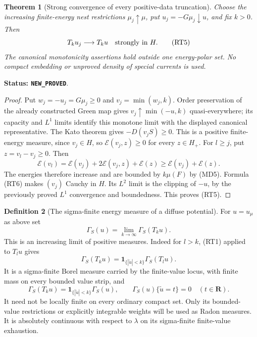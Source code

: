 \documentclass[11pt,a4paper]{article}
\numberwithin{equation}{section}
\newtheorem{theorem}{Theorem}[section]
\theoremstyle{definition}
\newtheorem{definition}[theorem]{Definition}
\theoremstyle{remark}
\begin{document}
\begin{theorem}[Strong convergence of every positive-data truncation]
\label{thm:r11-positive-diffuse-strong-truncations}
Choose the increasing finite-energy nest restrictions
$\mu_j\uparrow\mu$, put $u_j=-G\mu_j\downarrow u$, and
fix $k>0$.  Then
\[
                  T_k u_j\longrightarrow T_k u
                                  \quad\hbox{strongly in }H.
 \tag{RT5}
\]
The canonical monotonicity assertions hold outside one
energy-polar set.  No compact embedding or unproved density
of special currents is used.
\end{theorem}

\noindent\textbf{Status: \texttt{NEW\_PROVED}}.

\begin{proof}
Put $w_j=-u_j=G\mu_j\ge0$ and $v_j=\min(w_j,k)$.
Order preservation of the already constructed Green map gives
$v_j\uparrow\min(-u,k)$ quasi-everywhere; its capacity and
$L^1$ limits identify this monotone limit with the displayed
canonical representative.  The Kato theorem gives
$-D(v_jS)\ge0$.  This is a positive finite-energy measure,
since $v_j\in H$, so
$\mathcal E(v_j,z)\ge0$ for every $z\in H_+$.
For $l\ge j$, put $z=v_l-v_j\ge0$.  Then
\[
 \mathcal E(v_l)=\mathcal E(v_j)+2\mathcal E(v_j,z)
                                      +\mathcal E(z)
                  \ge\mathcal E(v_j)+\mathcal E(z).
 \tag{RT6}
\]
The energies therefore increase and are bounded by $k\mu(F)$
by (MD5).  Formula (RT6) makes $(v_j)$ Cauchy in $H$.
Its $L^2$ limit is the clipping of $-u$, by the previously
proved $L^1$ convergence and boundedness.  This proves (RT5).
\end{proof}

\begin{definition}[The sigma-finite energy measure of a diffuse potential]
\label{def:r11-positive-diffuse-energy-measure}
For $u=u_\mu$ as above set
\[
              \Gamma_S(u)=\lim_{k\to\infty}\Gamma_S(T_ku).
 \tag{RT7}
\]
This is an increasing limit of positive measures.  Indeed for
$l>k$, (RT1) applied to $T_lu$ gives
\[
 \Gamma_S(T_ku)
       =\mathbf1_{\{|\widetilde u|<k\}}\Gamma_S(T_lu).
 \tag{RT8}
\]
It is a sigma-finite Borel measure carried by the finite-value
locus, with finite mass on every bounded value strip, and
\[
 \Gamma_S(T_ku)
        =\mathbf1_{\{|\widetilde u|<k\}}\Gamma_S(u),
 \qquad \Gamma_S(u)\{\widetilde u=t\}=0\quad(t\in\mathbf R).
 \tag{RT9}
\]
It need not be locally finite on every ordinary compact set.
Only its bounded-value restrictions or explicitly integrable
weights will be used as Radon measures.  It is absolutely
continuous with respect to $\lambda$ on its sigma-finite
finite-value exhaustion.
\end{definition}
\end{document}
